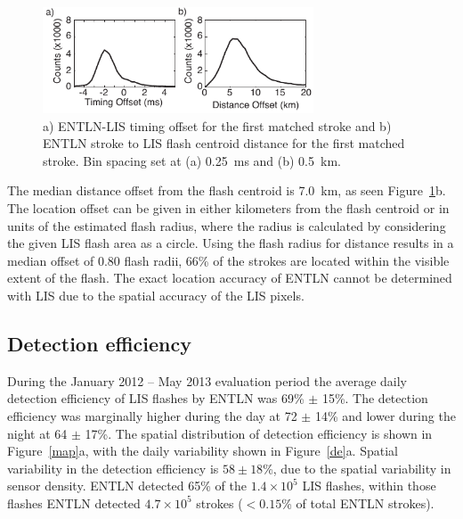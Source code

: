 \begin{figure}[t]
   \centering
   \noindent\includegraphics[width=19pc,angle=0]{entln_lis/Figures/accuracy.pdf}
   \caption{a) ENTLN-LIS timing offset for the first matched stroke and
   		b) ENTLN stroke to LIS flash centroid distance for the first matched stroke.
   		Bin spacing set at (a) 0.25~ms and (b) 0.5~km.}
   \label{accuracy}
\end{figure}

The median distance offset from the flash centroid is 7.0~km, as seen Figure~\ref{accuracy}b.
The location offset can be given in either kilometers from the flash centroid or in units of the estimated flash radius, where the radius is calculated by considering the given LIS flash area as a circle.
Using the flash radius for distance results in a median offset of 0.80 flash radii, 66\% of the strokes are located within the visible extent of the flash.
The exact location accuracy of ENTLN cannot be determined with LIS due to the spatial accuracy of the LIS pixels.

\subsection{Detection efficiency}

During the January 2012 -- May 2013 evaluation period the average daily detection efficiency of LIS flashes by ENTLN was 69\% $\pm$ 15\%.
The detection efficiency was marginally higher during the day at 72 $\pm$ 14\% and lower during the night at 64 $\pm$ 17\%.
The spatial distribution of detection efficiency is shown in Figure~\ref{map}a, with the daily variability shown in Figure~\ref{de}a.
Spatial variability in the detection efficiency is $58 \pm 18$\%, due to the spatial variability in sensor density.
ENTLN detected 65\% of the $1.4\times10^5$ LIS flashes, within those flashes ENTLN detected $4.7\times10^5$ strokes ($<0.15$\% of total ENTLN strokes).

